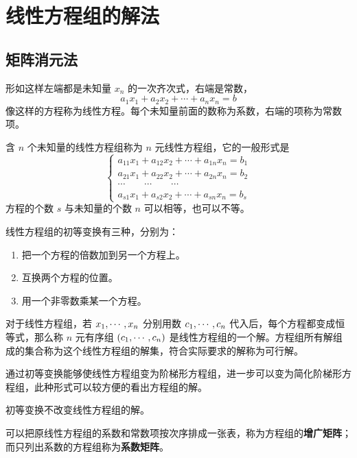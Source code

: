 \chapter{线性方程组的解法}

\section{矩阵消元法}

形如这样左端都是未知量 $x_n$ 的一次齐次式，右端是常数，
\[a_1x_1+a_2x_2+\cdots+a_nx_n=b\]
像这样的方程称为线性方程。每个未知量前面的数称为系数，右端的项称为常数项。

含 $n$ 个未知量的线性方程组称为 $n$ 元线性方程组，它的一般形式是
\[ \left\{
	\begin{matrix}
		a_{11}x_1+a_{12}x_2+\cdots+a_{1n}x_n=b_1 \\
		a_{21}x_1+a_{22}x_2+\cdots+a_{2n}x_n=b_2 \\
		\cdots\qquad\cdots\qquad\cdots           \\
		a_{s1}x_1+a_{s2}x_2+\cdots+a_{sn}x_n=b_s
	\end{matrix}
	\right. \]
方程的个数 $s$ 与未知量的个数 $n$ 可以相等，也可以不等。

\begin{definition}[线性方程组的初等变换]
	线性方程组的初等变换有三种，分别为：

	\begin{enumerate}
		\item 把一个方程的倍数加到另一个方程上。
		\item 互换两个方程的位置。
		\item 用一个非零数乘某一个方程。
	\end{enumerate}
\end{definition}

对于线性方程组，若 $x_1,\cdots,x_n$ 分别用数 $c_1,\cdots,c_n$ 代入后，每个方程都变成恒等式，那么称 $n$ 元有序组 $(c_1,\cdots,c_n)$ 是线性方程组的一个解。方程组所有解组成的集合称为这个线性方程组的解集，符合实际要求的解称为可行解。

通过初等变换能够使线性方程组变为阶梯形方程组，进一步可以变为简化阶梯形方程组，此种形式可以较方便的看出方程组的解。

\begin{theorem}
	初等变换不改变线性方程组的解。
\end{theorem}

可以把原线性方程组的系数和常数项按次序排成一张表，称为方程组的\textbf{增广矩阵}；而只列出系数的方程组称为\textbf{系数矩阵}。

